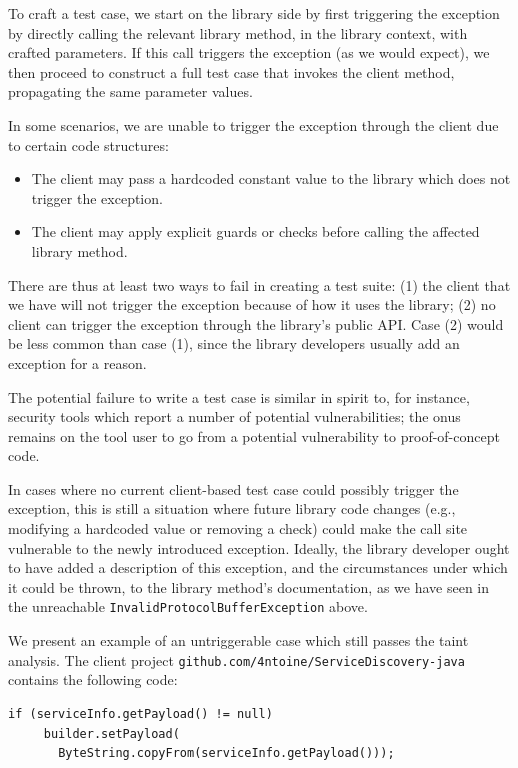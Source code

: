 To craft a test case, we start on the library side by first triggering the exception by directly calling the relevant library method, in the library context, with crafted parameters. If this call triggers the exception (as we would expect), we then proceed to construct a full test case that invokes the client method, propagating the same parameter values.

In some scenarios, we are unable to trigger the exception through the client due to certain code structures:
\begin{itemize}
  \item The client may pass a hardcoded constant value to the library which does not trigger the exception.
  \item The client may apply explicit guards or checks before calling the affected library method.
\end{itemize}
There are thus at least two ways to fail in creating a test suite: (1) the client that we have will not trigger the exception because of how it uses the library; (2) no client can trigger the exception through the library's public API. Case (2) would be less common than case (1), since the library developers usually add an exception for a reason.

The potential failure to write a test case is similar in spirit to, for instance, security tools which report a number of potential vulnerabilities; the onus remains on the tool user to go from a potential vulnerability to proof-of-concept code.

In cases where no current client-based test case could possibly trigger the exception, this is still a situation where future library code changes (e.g., modifying a hardcoded value or removing a check) could make the call site vulnerable to the newly introduced exception. Ideally, the library developer ought to have added a description of this exception, and the circumstances under which it could be thrown, to the library method's documentation, as we have seen in the unreachable \texttt{InvalidProtocolBufferException} above.

We present an example of an untriggerable case which still passes the taint analysis. The client project \texttt{github.com/4ntoine/ServiceDiscovery-java} contains the following code:

\begin{lstlisting}[style=javacode]
    if (serviceInfo.getPayload() != null)
     builder.setPayload(
       ByteString.copyFrom(serviceInfo.getPayload()));
\end{lstlisting}


